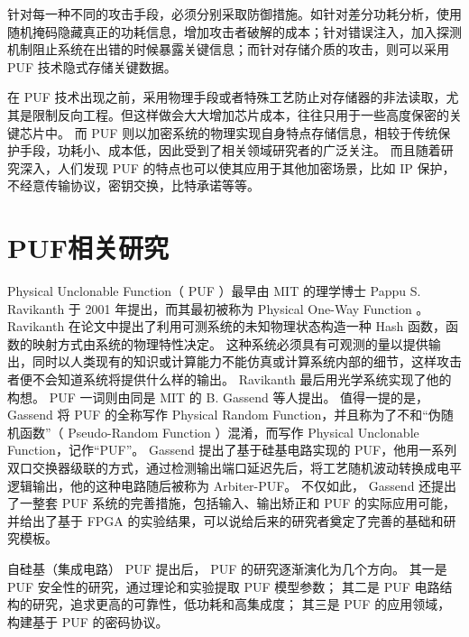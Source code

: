 针对每一种不同的攻击手段，必须分别采取防御措施。如针对差分功耗分析，使用随机掩码隐藏真正的功耗信息，增加攻击者破解的成本\supercite{rivain2010provably}；针对错误注入，加入探测机制阻止系统在出错的时候暴露关键信息\supercite{karaklajic2013hardware}；而针对存储介质的攻击，则可以采用 PUF 技术隐式存储关键数据。

在 PUF 技术出现之前，采用物理手段或者特殊工艺防止对存储器的非法读取，尤其是限制反向工程。但这样做会大大增加芯片成本，往往只用于一些高度保密的关键芯片中。
而 PUF 则以加密系统的物理实现自身特点存储信息，相较于传统保护手段，功耗小、成本低，因此受到了相关领域研究者的广泛关注。
而且随着研究深入，人们发现 PUF 的特点也可以使其应用于其他加密场景，比如 IP 保护\supercite{Guajardo2007fpga,kumar2008butterfly}，不经意传输协议\supercite{ruhrmair2010oblivious}，密钥交换\supercite{rostami2014robust}，比特承诺\supercite{ruhrmair2012practical}等等。

\section{PUF相关研究}\label{sec:PUF-research}
Physical Unclonable Function（ PUF ）最早由 MIT 的理学博士 Pappu S. Ravikanth 于 2001 年提出\supercite{pappu2002physical}，而其最初被称为 Physical One-Way Function 。
Ravikanth 在论文中提出了利用可测系统的未知物理状态构造一种 Hash 函数，函数的映射方式由系统的物理特性决定。
这种系统必须具有可观测的量以提供输出，同时以人类现有的知识或计算能力不能仿真或计算系统内部的细节，这样攻击者便不会知道系统将提供什么样的输出。
Ravikanth 最后用光学系统实现了他的构想。
PUF 一词则由同是 MIT 的 B. Gassend 等人提出\supercite{gassend2002silicon}。
值得一提的是， Gassend 将 PUF 的全称写作 Physical Random Function，并且称为了不和``伪随机函数''（ Pseudo-Random Function ）混淆，而写作 Physical Unclonable Function，记作``PUF''。
Gassend 提出了基于硅基电路实现的 PUF，他用一系列双口交换器级联的方式，通过检测输出端口延迟先后，将工艺随机波动转换成电平逻辑输出，他的这种电路随后被称为 Arbiter-PUF。
不仅如此， Gassend 还提出了一整套 PUF 系统的完善措施，包括输入、输出矫正和 PUF 的实际应用可能，并给出了基于 FPGA 的实验结果，可以说给后来的研究者奠定了完善的基础和研究模板。

自硅基（集成电路） PUF 提出后， PUF 的研究逐渐演化为几个方向。
其一是 PUF 安全性的研究，通过理论和实验提取 PUF 模型参数；
其二是 PUF 电路结构的研究，追求更高的可靠性，低功耗和高集成度；
其三是 PUF 的应用领域，构建基于 PUF 的密码协议。


